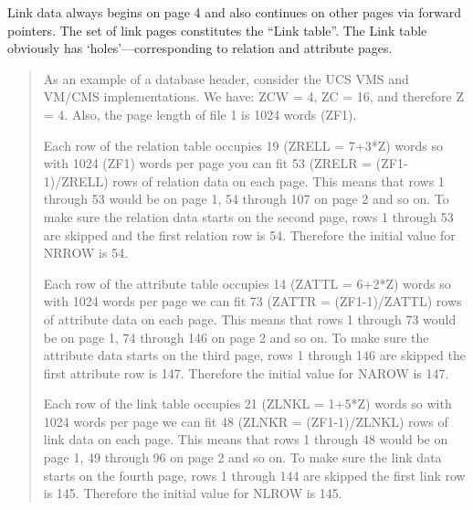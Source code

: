 \documentclass[11pt,a4paper]{report}
\begin{document}
 
Link data always begins on page 4 and also continues on
other pages via forward pointers.  The set of
link pages constitutes the ``Link table''.
The Link table obviously has `holes'---corresponding
to relation and attribute pages.
 
\begin{quotation}
 
As an example of a database header, consider the
UCS VMS and VM/CMS implementations.
We have: ZCW = 4, ZC = 16, and therefore Z = 4.
Also, the page length of file 1 is 1024 words (ZF1).
 
 
Each row of the relation table occupies 19 (ZRELL = 7+3*Z)
words so with 1024 (ZF1) words
per page you can fit 53 (ZRELR = (ZF1-1)/ZRELL)
rows of relation data on each  page.   This
means that rows 1 through 53 would be on page 1, 54 through 107 on
page 2 and so on.  To make sure the  relation  data  starts  on  the
second  page,  rows  1 through 53 are skipped and the first
relation row is 54.
Therefore the initial value  for  NRROW is 54.
 
Each row of the attribute table occupies 14 (ZATTL = 6+2*Z)
words so with 1024 words per page
we can fit 73 (ZATTR = (ZF1-1)/ZATTL)
rows of attribute data on each page.  This
means that rows 1 through 73 would be on page 1, 74 through 146 on
page  2  and  so  on.  To make sure the attribute data starts on the
third page, rows 1 through 146 are skipped the first
attribute  row is 147.
Therefore the initial value  for  NAROW is 147.
 
Each row of the link table occupies 21 (ZLNKL = 1+5*Z)
words so with 1024 words per page
we can fit 48 (ZLNKR = (ZF1-1)/ZLNKL)
rows of link data on each page.  This
means that rows 1 through 48 would be on page 1, 49 through 96 on
page  2  and  so  on.  To make sure the link data starts on the
fourth page, rows 1 through 144 are skipped the first
link row is 145.
Therefore the initial value  for  NLROW is 145.
 
\end{quotation}
 
 
\end{document}

